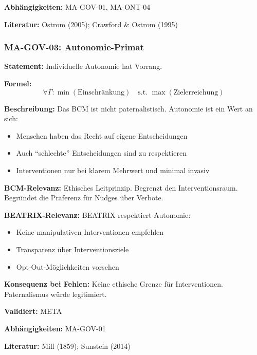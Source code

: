 \textbf{Abhängigkeiten:} MA-GOV-01, MA-ONT-04

\textbf{Literatur:} Ostrom (2005); Crawford \& Ostrom (1995)


\subsubsection*{MA-GOV-03: Autonomie-Primat}

\textbf{Statement:} Individuelle Autonomie hat Vorrang.

\textbf{Formel:}
\begin{equation}
\forall \Gamma: \min(\text{Einschränkung}) \quad \text{s.t. } \max(\text{Zielerreichung})
\end{equation}

\textbf{Beschreibung:}
Das BCM ist nicht paternalistisch. Autonomie ist ein Wert an sich:
\begin{itemize}
    \item Menschen haben das Recht auf eigene Entscheidungen
    \item Auch ``schlechte'' Entscheidungen sind zu respektieren
    \item Interventionen nur bei klarem Mehrwert und minimal invasiv
\end{itemize}

\textbf{BCM-Relevanz:}
Ethisches Leitprinzip. Begrenzt den Interventionsraum. Begründet die Präferenz für Nudges über Verbote.

\textbf{BEATRIX-Relevanz:}
BEATRIX respektiert Autonomie:
\begin{itemize}
    \item Keine manipulativen Interventionen empfehlen
    \item Transparenz über Interventionsziele
    \item Opt-Out-Möglichkeiten vorsehen
\end{itemize}

\textbf{Konsequenz bei Fehlen:}
Keine ethische Grenze für Interventionen. Paternalismus würde legitimiert.

\textbf{Validiert:} META

\textbf{Abhängigkeiten:} MA-GOV-01

\textbf{Literatur:} Mill (1859); Sunstein (2014)


